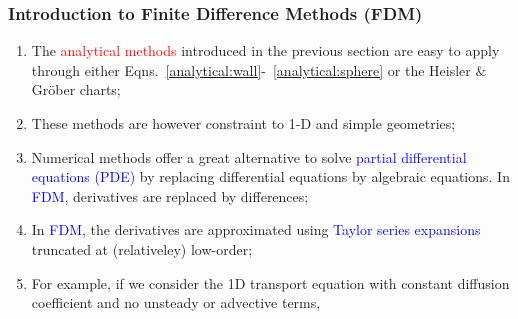 \documentclass[10pt,compress,unknownkeysallowed]{beamer}
\newcommand{\red}{\textcolor{red}}
\newcommand{\blue}{\textcolor{blue}}
\begin{document}
\begin{frame}
  \frametitle{Introduction to Finite Difference Methods (FDM)}
  \begin{enumerate}
     \item<1-> The \red{analytical methods} introduced in the previous section are easy to apply through either Eqns.~\ref{analytical:wall}-~\ref{analytical:sphere} or the Heisler $\&$ Gr\"ober charts;
     \item<1-> These methods are however constraint to 1-D and simple geometries;
     \item<2-> Numerical methods offer a great alternative to solve \blue{partial differential equations (PDE)} by replacing differential equations by algebraic equations. In \blue{FDM}, derivatives are replaced by differences; 
     \item<3-> In \blue{FDM}, the derivatives are approximated using \blue{Taylor series expansions} truncated at (relativeley) low-order;
     \item<3-> For example, if we consider the 1D transport equation with constant diffusion coefficient and no unsteady or advective terms,
  \end{enumerate}
\end{frame}
\end{document}
